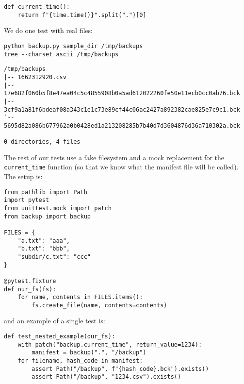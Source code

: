 \documentclass{scrbook}
\begin{document}
\begin{lstlisting}[frame=single,frameround=tttt]
def current_time():
    return f"{time.time()}".split(".")[0]
\end{lstlisting}



We do one test with real files:


\begin{lstlisting}[frame=single,frameround=tttt]
python backup.py sample_dir /tmp/backups
tree --charset ascii /tmp/backups
\end{lstlisting}



\begin{lstlisting}[frame=single,frameround=tttt]
/tmp/backups
|-- 1662312920.csv
|-- 17e682f060b5f8e47ea04c5c4855908b0a5ad612022260fe50e11ecb0cc0ab76.bck
|-- 3cf9a1a81f6bdeaf08a343c1e1c73e89cf44c06ac2427a892382cae825e7c9c1.bck
`-- 5695d82a086b677962a0b0428ed1a213208285b7b40d7d3604876d36a710302a.bck

0 directories, 4 files
\end{lstlisting}



The rest of our tests use a fake filesystem
and a mock replacement for the \texttt{current\_time} function
(so that we know what the manifest file will be called).
The setup is:


\begin{lstlisting}[frame=single,frameround=tttt]
from pathlib import Path
import pytest
from unittest.mock import patch
from backup import backup

FILES = {
    "a.txt": "aaa",
    "b.txt": "bbb",
    "subdir/c.txt": "ccc"
}

@pytest.fixture
def our_fs(fs):
    for name, contents in FILES.items():
        fs.create_file(name, contents=contents)
\end{lstlisting}



\noindent and an example of a single test is:


\begin{lstlisting}[frame=single,frameround=tttt]
def test_nested_example(our_fs):
    with patch("backup.current_time", return_value=1234):
        manifest = backup(".", "/backup")
    for filename, hash_code in manifest:
        assert Path("/backup", f"{hash_code}.bck").exists()
        assert Path("/backup", "1234.csv").exists()
\end{lstlisting}
\end{document}
